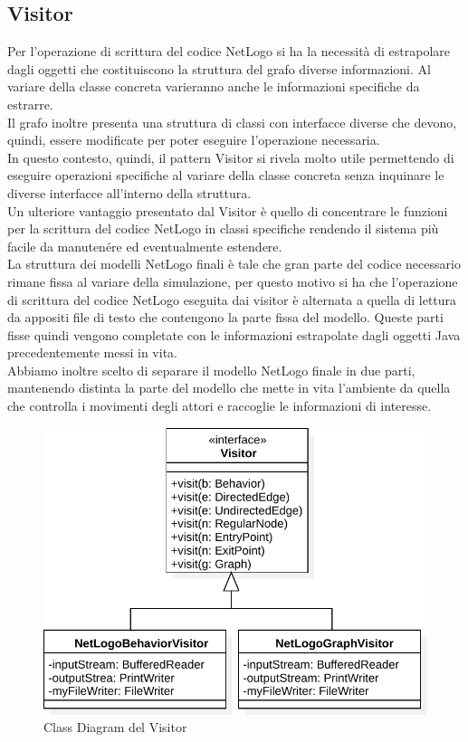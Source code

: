 \subsection{Visitor}
Per l'operazione di scrittura del codice NetLogo si ha la necessità di estrapolare dagli oggetti che costituiscono la struttura del grafo diverse informazioni. Al variare della classe concreta varieranno anche le informazioni specifiche da estrarre.\\
Il grafo inoltre presenta una struttura di classi con interfacce diverse che devono, quindi, essere modificate per poter eseguire l'operazione necessaria.\\
In questo contesto, quindi, il pattern Visitor si rivela molto utile permettendo di eseguire operazioni specifiche al variare della classe concreta senza inquinare le diverse interfacce all'interno della struttura.\\
Un ulteriore vantaggio presentato dal Visitor è quello di concentrare le funzioni per la scrittura del codice NetLogo in classi specifiche rendendo il sistema più facile da manutenére ed eventualmente estendere.\\
La struttura dei modelli NetLogo finali è tale che gran parte del codice necessario rimane fissa al variare della simulazione, per questo motivo si ha che l'operazione di scrittura del codice NetLogo eseguita dai visitor è alternata a quella di lettura da appositi file di testo che contengono la parte fissa del modello. Queste parti fisse quindi vengono completate con le informazioni estrapolate dagli oggetti Java precedentemente messi in vita.\\
Abbiamo inoltre scelto di separare il modello NetLogo finale in due parti, mantenendo distinta la parte del modello che mette in vita l'ambiente da quella che controlla i movimenti degli attori e raccoglie le informazioni di interesse.\\
\begin{figure}[htb]
\centering
\includegraphics[width=\textwidth,height=\textheight,keepaspectratio]{images/visitor-class-diagram.pdf}
\caption{Class Diagram del Visitor}
\label{fig:visitor-diagram}
\end{figure}
